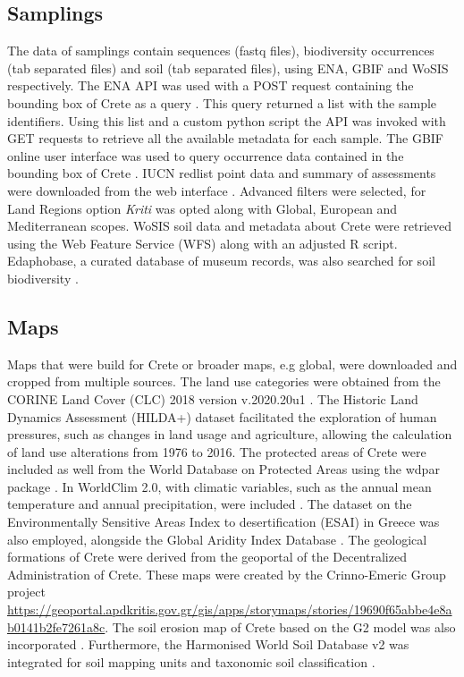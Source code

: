 \documentclass[a4paper,12pt]{article}
\begin{document}
\subsection{Samplings}\label{crete_samplings}

The data of samplings contain sequences (fastq files), biodiversity occurrences (tab separated files)
and soil (tab separated files), using ENA, GBIF and WoSIS respectively.
The ENA API was used with a POST request containing the bounding box of Crete as a query \parencite{ocathail2024the-european}. This 
query returned a list with the sample identifiers. Using this list and a custom python script the API
was invoked with GET requests to retrieve all the available metadata for each sample.
The GBIF online user interface was used to query occurrence data contained in
the bounding box of Crete \parencite{noauthor_gbif_nodate, gbif.org-user2023occurrence}.
IUCN redlist point data and summary of assessments were downloaded from the web interface \parencite{iucn2024}.
Advanced filters were selected, for Land Regions option \textit{Kriti} was opted
along with Global, European and Mediterranean scopes.
WoSIS soil data and metadata about Crete were retrieved using the Web Feature Service (WFS) \parencite{Batjes2024}
along with an adjusted R script.
Edaphobase, a curated database of museum records, was also searched for soil biodiversity \parencite{BURKHARDT20143}.

\subsection{Maps}\label{crete_spatial}

Maps that were build for Crete or broader maps, e.g global,
were downloaded and cropped from multiple sources.
The land use categories were obtained from the CORINE Land Cover (CLC) 2018
version v.2020.20u1 \parencite{CLC2023}.
The Historic Land Dynamics Assessment (HILDA+) dataset \parencite{winkler2021global}
facilitated the exploration of human pressures, such as changes in land usage and agriculture,
allowing the calculation of land use alterations from 1976 to 2016.
The protected areas of Crete were included as well from the World Database on Protected Areas using the wdpar package \parencite{Hanson2022}.
In WorldClim 2.0, with climatic variables, such as the annual mean
temperature and annual precipitation, were included \parencite{Fick2017}.
The dataset on the Environmentally Sensitive Areas Index to desertification (ESAI)
in Greece \parencite{KARAMESOUTI2018266} was also employed, alongside the
Global Aridity Index Database \parencite{zomer2022version}.
The geological formations of Crete were derived from the geoportal of the
Decentralized Administration of Crete. These maps were created by the Crinno-Emeric Group
project \url{https://geoportal.apdkritis.gov.gr/gis/apps/storymaps/stories/19690f65abbe4e8ab0141b2fe7261a8c}.
The soil erosion map of Crete based on the G2 model was also incorporated \parencite{panagos2014seasonal}.
Furthermore, the Harmonised World Soil Database v2 was integrated for soil
mapping units and taxonomic soil classification \parencite{fao2023}.
\end{document}
